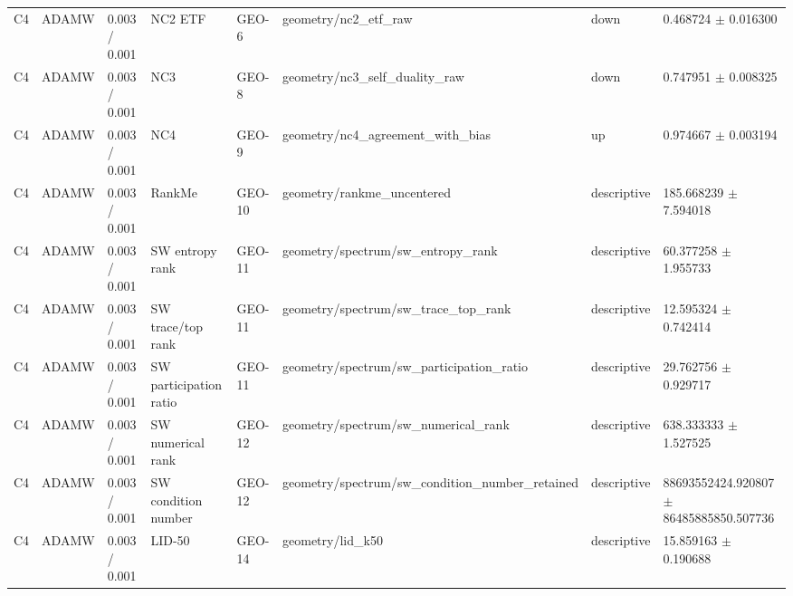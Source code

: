 \begin{longtable}{llllllll}
C4 & ADAMW & 0.003 / 0.001 & NC2 ETF & GEO-6 & geometry/nc2\_etf\_raw & down & 0.468724 $\pm$ 0.016300 \\
C4 & ADAMW & 0.003 / 0.001 & NC3 & GEO-8 & geometry/nc3\_self\_duality\_raw & down & 0.747951 $\pm$ 0.008325 \\
C4 & ADAMW & 0.003 / 0.001 & NC4 & GEO-9 & geometry/nc4\_agreement\_with\_bias & up & 0.974667 $\pm$ 0.003194 \\
C4 & ADAMW & 0.003 / 0.001 & RankMe & GEO-10 & geometry/rankme\_uncentered & descriptive & 185.668239 $\pm$ 7.594018 \\
C4 & ADAMW & 0.003 / 0.001 & SW entropy rank & GEO-11 & geometry/spectrum/sw\_entropy\_rank & descriptive & 60.377258 $\pm$ 1.955733 \\
C4 & ADAMW & 0.003 / 0.001 & SW trace/top rank & GEO-11 & geometry/spectrum/sw\_trace\_top\_rank & descriptive & 12.595324 $\pm$ 0.742414 \\
C4 & ADAMW & 0.003 / 0.001 & SW participation ratio & GEO-11 & geometry/spectrum/sw\_participation\_ratio & descriptive & 29.762756 $\pm$ 0.929717 \\
C4 & ADAMW & 0.003 / 0.001 & SW numerical rank & GEO-12 & geometry/spectrum/sw\_numerical\_rank & descriptive & 638.333333 $\pm$ 1.527525 \\
C4 & ADAMW & 0.003 / 0.001 & SW condition number & GEO-12 & geometry/spectrum/sw\_condition\_number\_retained & descriptive & 88693552424.920807 $\pm$ 86485885850.507736 \\
C4 & ADAMW & 0.003 / 0.001 & LID-50 & GEO-14 & geometry/lid\_k50 & descriptive & 15.859163 $\pm$ 0.190688 \\
\end{longtable}
